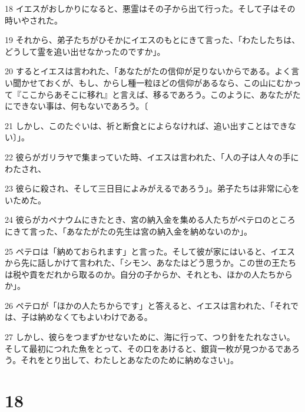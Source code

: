 \par 18 イエスがおしかりになると、悪霊はその子から出て行った。そして子はその時いやされた。
\par 19 それから、弟子たちがひそかにイエスのもとにきて言った、「わたしたちは、どうして霊を追い出せなかったのですか」。
\par 20 するとイエスは言われた、「あなたがたの信仰が足りないからである。よく言い聞かせておくが、もし、からし種一粒ほどの信仰があるなら、この山にむかって『ここからあそこに移れ』と言えば、移るであろう。このように、あなたがたにできない事は、何もないであろう。〔
\par 21 しかし、このたぐいは、祈と断食とによらなければ、追い出すことはできない〕」。
\par 22 彼らがガリラヤで集まっていた時、イエスは言われた、「人の子は人々の手にわたされ、
\par 23 彼らに殺され、そして三日目によみがえるであろう」。弟子たちは非常に心をいためた。
\par 24 彼らがカペナウムにきたとき、宮の納入金を集める人たちがペテロのところにきて言った、「あなたがたの先生は宮の納入金を納めないのか」。
\par 25 ペテロは「納めておられます」と言った。そして彼が家にはいると、イエスから先に話しかけて言われた、「シモン、あなたはどう思うか。この世の王たちは税や貢をだれから取るのか。自分の子からか、それとも、ほかの人たちからか」。
\par 26 ペテロが「ほかの人たちからです」と答えると、イエスは言われた、「それでは、子は納めなくてもよいわけである。
\par 27 しかし、彼らをつまずかせないために、海に行って、つり針をたれなさい。そして最初につれた魚をとって、その口をあけると、銀貨一枚が見つかるであろう。それをとり出して、わたしとあなたのために納めなさい」。

\chapter{18}

